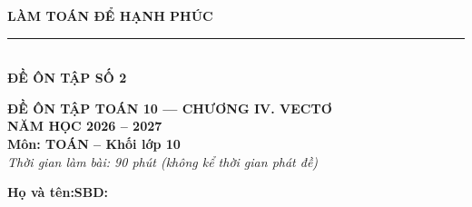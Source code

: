 \documentclass[10pt,a4paper]{article}
\begin{document}
\noindent
\begin{minipage}[c]{0.38\textwidth}
    \centering
    \textbf{LÀM TOÁN ĐỂ HẠNH PHÚC}\\[-2pt]
    \rule{3.2cm}{0.6pt}\\[2pt]
    \textbf{ĐỀ ÔN TẬP SỐ 2}
\end{minipage}\hfill
\begin{minipage}[c]{0.52\textwidth}
    \centering
    \textbf{ĐỀ ÔN TẬP TOÁN 10 — CHƯƠNG IV. VECTƠ}\\[1pt]
    \textbf{NĂM HỌC 2026 -- 2027}\\[1pt]
    \textbf{Môn: TOÁN -- Khối lớp 10}\\
    \textit{\small Thời gian làm bài: 90 phút (không kể thời gian phát đề)}
\end{minipage}

\vspace{0.05cm}
\noindent
\begin{minipage}[b]{0.78\textwidth}
    \textbf{Họ và tên:}\dotfill\textbf{SBD:}\makebox[3.5cm]{\dotfill}
\end{minipage}\hfill
\begin{minipage}[b]{0.20\textwidth}
    \hfill
    \setlength{\fboxrule}{0.8pt}%
\end{minipage}
\vspace{0.05cm}
\end{document}
